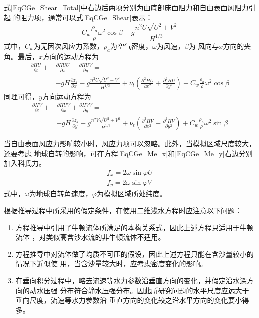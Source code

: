 式\eqref{EqCGe_Shear_Total}中右边后两项分别为由底部床面阻力和自由表面风阻力引起
的阻力项，通常可以式\eqref{EqCGe_Shear}表示：
\begin{equation}
  C_{w}\frac{\rho_{a}}{\rho}\omega^{2}\cos\beta
  -
  g\frac{n^{2}U\sqrt{U^{2}+V^{2}}}{H^{1/3}}
  \label{EqCGe_Shear}
\end{equation}
式中，$C_{w}$为无因次风应力系数，$\rho_{a}$为空气密度，$\omega$为风速，$\beta$为
风向与$x$方向的夹角。最后，$x$方向的运动方程为
\begin{equation}
  \begin{aligned}
    \frac{\partial HU}{\partial t} +
    &\frac{\partial HUU}{\partial x} +
    \frac{\partial HUV}{\partial y}
    =\\
    &-gH\frac{\partial  z_{s}}{\partial x}
    -g\frac{n^{2}U\sqrt{U^{2}+V^{2}}}{H^{1/3}}
    +
    \nu_{t}\left(
    \frac{\partial^{2}HU}{\partial x^{2}}+
    \frac{\partial^{2}HU}{\partial y^{2}}
    \right)
    +C_{w}\frac{\rho_{a}}{\rho}\omega^{2}\cos\beta
  \end{aligned}
  \label{EqCGe_Me_x}
\end{equation}
同理可得，$y$方向运动方程为
\begin{equation}
  \begin{aligned}
    \frac{\partial HV}{\partial t} +
    &\frac{\partial HUV}{\partial x} +
    \frac{\partial HVV}{\partial y}
    =\\
    &-gH\frac{\partial  z_{s}}{\partial y}
    -g\frac{n^{2}V\sqrt{U^{2}+V^{2}}}{H^{1/3}}
    +
    \nu_{t}\left(
    \frac{\partial^{2}HV}{\partial x^{2}}+
    \frac{\partial^{2}HV}{\partial y^{2}}
    \right)
    +C_{w}\frac{\rho_{a}}{\rho}\omega^{2}\sin\beta
  \end{aligned}
  \label{EqCGe_Me_y}
\end{equation}

当自由表面风应力影响较小时，风应力项可以忽略。此外，当模拟区域尺度较大，还要考虑
地球自转的影响，可在方程\eqref{EqCGe_Me_x}和\eqref{EqCGe_Me_y}右边分别加入科氏力。
\begin{equation}
  \begin{aligned}
    f_x = 2\omega\sin\varphi U
    \\
    f_y = 2\omega\sin\varphi V
  \end{aligned}
\end{equation}
式中，$\omega$为地球自转角速度，$\varphi$为模拟区域所处纬度。

根据推导过程中所采用的假定条件，在使用二维浅水方程时应注意以下问题：
\begin{enumerate}
  \item 方程推导中引用了牛顿流体所满足的本构关系式，因此上述方程只适用于牛顿流体
    ，对类似高含沙水流的非牛顿流体不适用。
  \item 方程推导中对流体做了均质不可压的假设，因此上述方程只能在含沙量较小的情况下近似使
    用，当含沙量较大时，应考虑密度变化的影响。
  \item 在垂向积分过程中，略去流速等水力参数沿垂直方向的变化，并假定沿水深方向的动水压强
    分布符合静水压强分布。因此所研究问题的水平尺度应远大于垂向尺度，流速等水力参数沿
    垂直方向的变化较之沿水平方向的变化要小得多。
\end{enumerate}

